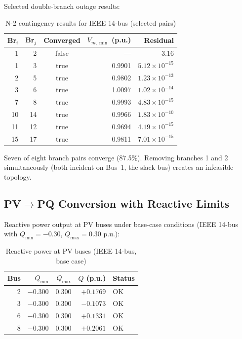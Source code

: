 \documentclass[11pt]{article}
\begin{document}
Selected double-branch outage results:

\begin{table}[h]
\centering
\caption{N-2 contingency results for IEEE 14-bus (selected pairs)}
\label{tab:n2_contingency}
\begin{tabular}{r r c r r}
\toprule
Br$_i$ & Br$_j$ & Converged & $V_{m,\min}$ (p.u.) & Residual \\
\midrule
 1 &  2 & false & --- & $3.16$ \\
 1 &  3 & true  & 0.9901 & $5.12 \times 10^{-15}$ \\
 2 &  5 & true  & 0.9802 & $1.23 \times 10^{-13}$ \\
 3 &  6 & true  & 1.0097 & $1.02 \times 10^{-14}$ \\
 7 &  8 & true  & 0.9993 & $4.83 \times 10^{-15}$ \\
10 & 14 & true  & 0.9966 & $1.83 \times 10^{-10}$ \\
11 & 12 & true  & 0.9694 & $4.19 \times 10^{-15}$ \\
15 & 17 & true  & 0.9811 & $7.01 \times 10^{-15}$ \\
\bottomrule
\end{tabular}
\end{table}

Seven of eight branch pairs converge (87.5\%). Removing branches 1 and 2 simultaneously (both incident on Bus~1, the slack bus) creates an infeasible topology.

\subsection{PV$\to$PQ Conversion with Reactive Limits}

Reactive power output at PV buses under base-case conditions (IEEE 14-bus with $Q_{\min} = -0.30$, $Q_{\max} = 0.30$ p.u.):

\begin{table}[h]
\centering
\caption{Reactive power at PV buses (IEEE 14-bus, base case)}
\label{tab:pvpq}
\begin{tabular}{r r r r l}
\toprule
Bus & $Q_{\min}$ & $Q_{\max}$ & $Q$ (p.u.) & Status \\
\midrule
 2 & $-0.300$ & $0.300$ & $+0.1769$ & OK \\
 3 & $-0.300$ & $0.300$ & $-0.1073$ & OK \\
 6 & $-0.300$ & $0.300$ & $+0.1331$ & OK \\
 8 & $-0.300$ & $0.300$ & $+0.2061$ & OK \\
\bottomrule
\end{tabular}
\end{table}
\end{document}
